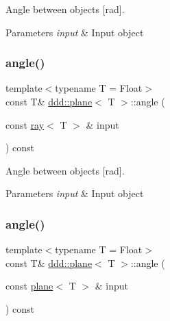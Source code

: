 Angle between objects \mbox{[}rad\mbox{]}. 


\begin{DoxyParams}{Parameters}
{\em input} & Input object \\
\hline
\end{DoxyParams}
\mbox{\label{classddd_1_1plane_a4e472e461308a96438c26b73b9338593}} 
\subsubsection{\texorpdfstring{angle()}{angle()}\hspace{0.1cm}{\footnotesize\ttfamily [2/4]}}
{\footnotesize\ttfamily template$<$typename T = Float$>$ \\
const T\& \hyperlink{classddd_1_1plane}{ddd\+::plane}$<$ T $>$\+::angle (\begin{DoxyParamCaption}\item[{const \hyperlink{classddd_1_1ray}{ray}$<$ T $>$ \&}]{input }\end{DoxyParamCaption}) const\hspace{0.3cm}{\ttfamily [inline]}}



Angle between objects \mbox{[}rad\mbox{]}. 


\begin{DoxyParams}{Parameters}
{\em input} & Input object \\
\hline
\end{DoxyParams}
\mbox{\label{classddd_1_1plane_ae6f58f5c23ff49aa351f22ccccee46b6}} 
\subsubsection{\texorpdfstring{angle()}{angle()}\hspace{0.1cm}{\footnotesize\ttfamily [3/4]}}
{\footnotesize\ttfamily template$<$typename T = Float$>$ \\
const T\& \hyperlink{classddd_1_1plane}{ddd\+::plane}$<$ T $>$\+::angle (\begin{DoxyParamCaption}\item[{const \hyperlink{classddd_1_1plane}{plane}$<$ T $>$ \&}]{input }\end{DoxyParamCaption}) const\hspace{0.3cm}{\ttfamily [inline]}}



